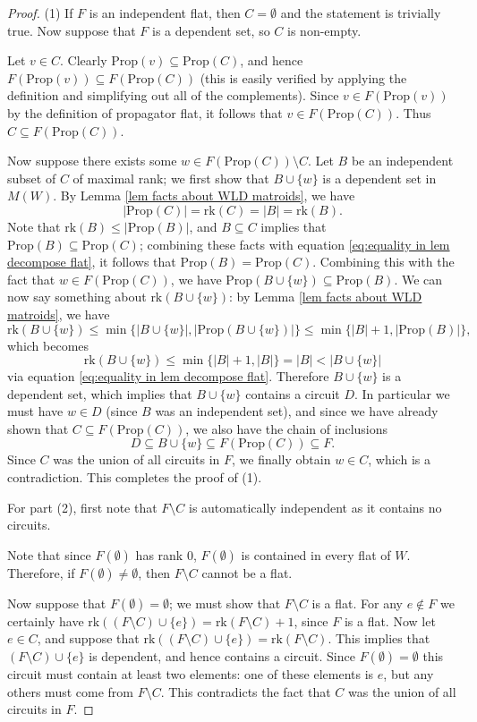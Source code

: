 \documentclass[11pt]{article}
\newcommand{\rk}{\textrm{rk} }
\newcommand{\Prop}{\textrm{Prop}}
\theoremstyle{remark}
\theoremstyle{definition}
\begin{document}
\begin{proof}
(1) If $F$ is an independent flat, then $C = \emptyset$ and the statement is trivially true. Now suppose that $F$ is a dependent set, so $C$ is non-empty.

Let $v \in C$. Clearly $\Prop(v) \subseteq \Prop(C)$, and hence $F(\Prop(v)) \subseteq F(\Prop(C))$ (this is easily verified by applying the definition and simplifying out all of the complements). Since $v \in F(\Prop(v))$ by the definition of propagator flat, it follows that $v \in F(\Prop(C))$. Thus $C \subseteq F(\Prop(C))$.

Now suppose there exists some $w \in  F(\Prop(C)) \setminus C$. Let $B$ be an independent subset of $C$ of maximal rank; we first show that $B \cup \{w\}$ is a dependent set in $M(W)$. By Lemma \ref{lem facts about WLD matroids}, we have
\begin{equation}\label{eq:equality in lem decompose flat} |\Prop(C)| = \rk(C) = |B| = \rk(B) .\end{equation}
Note that $\rk(B) \leq |\Prop(B)|$, and $B \subseteq C$ implies that $\Prop(B) \subseteq \Prop(C)$; combining these facts with equation \eqref{eq:equality in lem decompose flat}, it follows that $\Prop(B) = \Prop(C)$. Combining this with the fact that $w \in F(\Prop(C))$, we have $\Prop(B\cup \{w\}) \subseteq \Prop(B)$. We can now say something about $\rk(B\cup \{w\})$: by Lemma \ref{lem facts about WLD matroids}, we have 
\[
\rk (B \cup \{w\}) \leq \min\{|B\cup \{w\}|, |\Prop(B\cup \{w\})|\} \leq \min\{|B|+1,|\Prop(B)|\},
\]
which becomes 
\[\rk(B\cup \{w\}) \leq \min\{|B|+1,|B|\} = |B| < |B \cup\{w\}|\]
via equation \eqref{eq:equality in lem decompose flat}. Therefore $B\cup\{w\}$ is a dependent set, which implies that $B\cup \{w\}$ contains a circuit $D$. In particular we must have $w \in D$ (since $B$ was an independent set), and since we have already shown that $C \subseteq F(\Prop(C))$, we also have the chain of inclusions 
\[D \subseteq B\cup \{w\} \subseteq F(\Prop(C)) \subseteq F.\]
Since $C$ was the union of all circuits in $F$, we finally obtain $w \in C$, which is a contradiction. This completes the proof of (1).


For part (2), first note that $F \setminus C$ is automatically independent as it contains no circuits.

Note that since $F(\emptyset)$ has rank $0$, $F(\emptyset)$ is contained in every flat of $W$. Therefore, if $F(\emptyset) \neq \emptyset$, then $F\setminus C$ cannot be a flat. 

Now suppose that $F(\emptyset) = \emptyset$; we must show that $F\setminus C$ is a flat. For any $e \not\in F$ we certainly have $\rk((F\setminus C)\cup\{e\}) = \rk(F\setminus C) +1$, since $F$ is a flat. Now let $e \in C$, and suppose that $\rk((F\setminus C)\cup\{e\}) = \rk(F\setminus C)$. This implies that $(F\setminus C)\cup \{e\}$ is dependent, and hence contains a circuit. Since $F(\emptyset) = \emptyset$ this circuit must contain at least two elements: one of these elements is $e$, but any others must come from $F \setminus C$. This contradicts the fact that $C$ was the union of all circuits in $F$. 


\end{proof}
\end{document}
